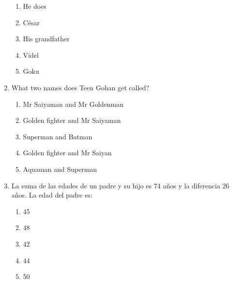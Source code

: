 \documentclass[letterpaper,addpoints,answers,twocolumn,10pt]{exam}
\begin{document}
\begin{enumerate}[leftmargin=.2in]
\begin{enumerate}[noitemsep,leftmargin=0in]
\item  He does
\item  César
\item  His grandfather
\item  Videl
\item  Goku


\end{enumerate}



\item  What two names does Teen Gohan get called?


\begin{enumerate}[noitemsep,leftmargin=0in]


\item  Mr Saiyaman and Mr Goldenman
\item  Golden fighter and Mr Saiyaman
\item  Superman and Batman
\item  Golden fighter and Mr Saiyan
\item  Aquaman and Superman


\end{enumerate}



\item  La suma de las edades de un padre y su hijo es 74 años y la diferencia 26 años. La edad del padre es:


\begin{enumerate}[noitemsep,leftmargin=0in]


\item  45
\item  48
\item  42
\item  44
\item  50


\end{enumerate}



\end{enumerate}
\end{document}
